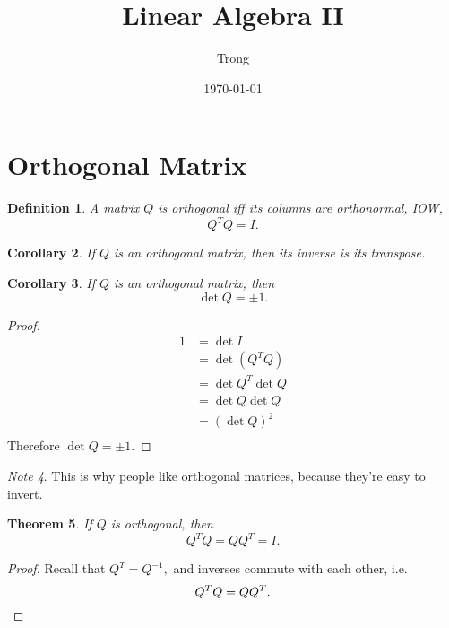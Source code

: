 \documentclass[12pt]{article}
\title{Linear Algebra II}
\author{Trong}
\date{\today}
\theoremstyle{plain}
\newtheorem{theorem}{Theorem}
\newtheorem{corollary}[theorem]{Corollary}
\newtheorem{definition}[theorem]{Definition}
\theoremstyle{definition}
\theoremstyle{remark}
\newtheorem{note}[theorem]{Note}
\newcommand{\0}{\varnothing}
\newcommand{\<}{\langle}
\renewcommand{\>}{\rangle}
\begin{document}
\sloppy
\maketitle
\thispagestyle{empty}
\pagestyle{empty}


\section{Orthogonal Matrix}

\begin{definition}
  A matrix \( Q \) is orthogonal iff its columns are orthonormal, IOW,
  \[
  Q^{T} Q = I.
  \]
\end{definition}

\begin{corollary}
  If \( Q \) is an orthogonal matrix, then its inverse is its transpose.
\end{corollary}

\begin{corollary}
  If \( Q \) is an orthogonal matrix, then
\[
\det Q = \pm 1.
\]
\end{corollary}

\begin{proof}
  \[
\begin{aligned}
1 &= \det I \\
  &= \det(Q^{T} Q) \\
  &= \det Q^{T} \det Q \\
  &= \det Q \det Q \\
  &= (\det Q)^{2} \\
\end{aligned}
\]
Therefore \( \det Q = \pm 1. \)
\end{proof}

\begin{note}
  This is why people like orthogonal matrices, because they're easy to invert.
\end{note}

\begin{theorem}
  If \( Q \) is orthogonal, then
\[
Q^{T} Q = Q Q^{T} = I.
\]
\end{theorem}

\begin{proof}
  Recall that \( Q^{T} = Q^{-1}, \) and inverses commute with each other, i.e.
\[
Q^{T} Q = Q Q^{T}. \qedhere
\]
\end{proof}
\end{document}
